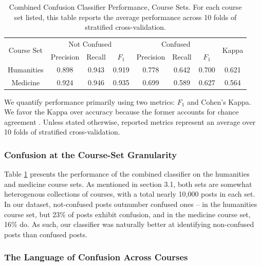 \documentclass{edm_template}
\begin{document}
\begin{table}[htp!]
    \centering
    \begin{tabular}{|c|c c c|c c c|c|}
    \hline
    \multirow{2}{*}{Course Set} & \multicolumn{3}{c|}{Not Confused} & \multicolumn{3}{c|}{Confused}  & \multirow{2}{*}{Kappa} \\ \cline{2-7}
                                &  Precision & Recall & $F_{1}$     &  Precision & Recall & $F_{1}$  &       \\ \hline
    Humanities                  & 0.898      & 0.943    & 0.919     & 0.778      & 0.642  & 0.700    & 0.621  \\ \hline
    Medicine                    & 0.924      & 0.946    & 0.935     & 0.699      & 0.589  & 0.627    & 0.564  \\ \hline

    \end{tabular}
    \caption{\textnormal{
       Combined Confusion Classifier Performance, Course Sets. For each course set listed, this table reports the average performance across 10 folds of stratified cross-validation.
    }} %
    \label{table:confusion_sets} %
\end{table}

We quantify performance primarily using two metrics: $F_{1}$ and Cohen's Kappa. We favor the Kappa over accuracy because the former accounts for chance agreement \cite{cohen1960coefficient}. Unless stated otherwise, reported metrics represent an average over 10 folds of stratified cross-validation. 

\subsubsection{Confusion at the Course-Set Granularity}
Table \ref{table:confusion_sets} presents the performance of the combined classifier on the humanities and medicine course sets. As mentioned in section 3.1, both sets are somewhat heterogenous collections of courses, with a total nearly 10,000 posts in each set. In our dataset, not-confused posts outnumber confused ones -- in the humanities course set, but 23\% of posts exhibit confusion, and in the medicine course set, 16\% do. As such, our classifier was naturally better at identifying non-confused posts than confused posts.

\subsubsection{The Language of Confusion Across Courses}
\end{document}
